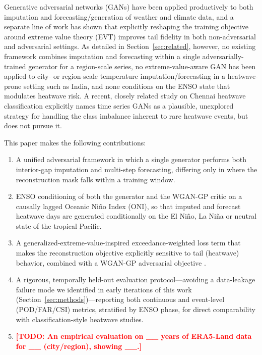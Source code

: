 \documentclass[conference]{IEEEtran}
\newcommand{\TODO}[1]{\textcolor{red}{\textbf{[TODO: #1]}}}
\begin{document}
Generative adversarial networks (GANs) \cite{goodfellow2014generative} have been applied productively
to both imputation \cite{luo2018multivariate,zhao2024qar} and forecasting/generation
\cite{bihlo2021generative,balogun2024temperaturegan,glawion2025spateganera5} of weather and climate
data, and a separate line of work has shown that explicitly reshaping the training objective around
extreme value theory (EVT) improves tail fidelity in both non-adversarial
\cite{ding2019modeling,zhang2021enhancing} and adversarial
\cite{huster2021pareto,bhatia2021exgan,boulaguiem2022modeling,liu2025deepxgan} settings. As detailed
in Section~\ref{sec:related}, however, no existing framework combines imputation and forecasting within
a single adversarially-trained generator for a region-scale series, no extreme-value-aware GAN has been
applied to city- or region-scale temperature imputation/forecasting in a heatwave-prone setting such as
India, and none conditions on the ENSO state that modulates heatwave risk. A recent, closely related
study on Chennai heatwave classification \cite{choudary2025comparative} explicitly names time series
GANs as a plausible, unexplored strategy for handling the class imbalance inherent to rare heatwave
events, but does not pursue it.

This paper makes the following contributions:
\begin{enumerate}
    \item A unified adversarial framework in which a single generator performs both interior-gap
    imputation and multi-step forecasting, differing only in where the reconstruction mask falls within
    a training window.
    \item ENSO conditioning of both the generator and the WGAN-GP critic on a causally lagged Oceanic
    Ni\~{n}o Index (ONI), so that imputed and forecast heatwave days are generated conditionally on the
    El Ni\~{n}o, La Ni\~{n}a or neutral state of the tropical Pacific.
    \item A generalized-extreme-value-inspired exceedance-weighted loss term that makes the
    reconstruction objective explicitly sensitive to tail (heatwave) behavior, combined with a WGAN-GP
    adversarial objective \cite{arjovsky2017wasserstein,gulrajani2017improved}.
    \item A rigorous, temporally held-out evaluation protocol---avoiding a data-leakage failure mode we
    identified in early iterations of this work (Section~\ref{sec:methods})---reporting both continuous
    and event-level (POD/FAR/CSI) metrics, stratified by ENSO phase, for direct comparability with
    classification-style heatwave studies.
    \item \TODO{An empirical evaluation on \_\_ years of ERA5-Land data for \_\_ (city/region), showing
    \_\_.}
\end{enumerate}
\end{document}
